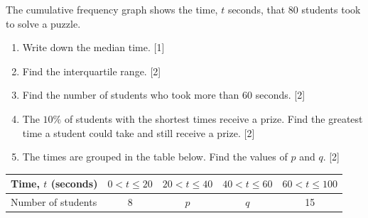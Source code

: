 \documentclass[12pt, twoside]{article}
\begin{document}
\begin{enumerate}[itemsep=0.15cm]
The cumulative frequency graph shows the time, $t$ seconds, that $80$
students took to solve a puzzle.

\begin{center}
\end{center}

\begin{enumerate}[itemsep=0.02cm]
  \item Write down the median time. \hfill [1]
  \item Find the interquartile range. \hfill [2]
  \item Find the number of students who took more than $60$ seconds.
  \hfill [2]
  \item The $10\%$ of students with the shortest times receive a prize.
  Find the greatest time a student could take and still receive a
  prize. \hfill [2]
  \item The times are grouped in the table below. Find the values of
  $p$ and $q$. \hfill [2]
\end{enumerate}

\begin{center}
\setlength{\tabcolsep}{8pt}\renewcommand{\arraystretch}{1.2}
\begin{tabular}{|l|c|c|c|c|}
\hline
Time, $t$ (seconds) & $0 < t \le 20$ & $20 < t \le 40$ & $40 < t \le 60$ & $60 < t \le 100$ \\
\hline
Number of students & 8 & $p$ & $q$ & 15 \\
\hline
\end{tabular}
\end{center}



\end{enumerate}
\end{document}
